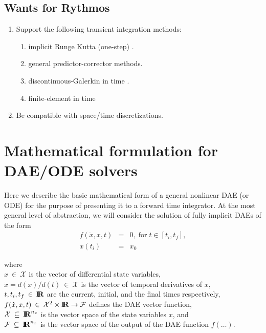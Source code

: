 \documentclass[pdf,ps2pdf,11pt]{SANDreport}
\begin{document}
\subsection{Wants for Rythmos}

\begin{enumerate}

{}\item Support the following transient integration methods:
  \begin{enumerate}
  {}\item implicit Runge Kutta (one-step) \cite{IRKMethods}.
  {}\item general predictor-corrector methods.
  {}\item discontinuous-Galerkin in time \cite{DGTime}.
  {}\item finite-element in time \cite{FETime}
  \end{enumerate}
{}\item Be compatible with space/time discretizations.

\end{enumerate}




\section{Mathematical formulation for DAE/ODE solvers}
\label{rythmos:scn:mathformulation}

Here we describe the basic mathematical form of a general nonlinear DAE (or
ODE) for the purpose of presenting it to a forward time integrator.  At the
most general level of abstraction, we will consider the solution of fully
implicit DAEs of the form
%
\begin{eqnarray}
f(\dot{x},x,t) & = & 0, \; \mbox{for} \; t \in [t_i, t_f], \label{rythmos:eqn:dae} \\
x(t_i) & = & x_0 \label{rythmos:eqn:dae:ic}
\end{eqnarray}
\begin{tabbing}
\hspace{4ex}where\hspace{5ex}\= \\
\>	$x\:\in\:\mathcal{X}$ is the vector of differential state variables, \\
\>	$\dot{x} = d(x)/d(t)\:\in\:\mathcal{X}$ is the vector of temporal derivatives of $x$, \\
\>	$t, t_i, t_f\:\in\:\mbox{\textbf{I}}\hspace{-0.6ex}\mbox{\textbf{R}}$ are the current, initial, and the final times respectively, \\
\>	$f(\dot{x},x,t)\:\in\:\mathcal{X}^2\times\mbox{\textbf{I}}\hspace{-0.6ex}\mbox{\textbf{R}}\rightarrow\mathcal{F}$ defines the DAE vector function, \\
\>	$\mathcal{X} \:\subseteq\:\mbox{\textbf{I}}\hspace{-0.6ex}\mbox{\textbf{R}}^{n_x}$ is the vector space of the state variables $x$, and \\
\>	$\mathcal{F} \:\subseteq\:\mbox{\textbf{I}}\hspace{-0.6ex}\mbox{\textbf{R}}^{n_x}$ is the vector space of the output of the DAE function $f(\ldots)$.
\end{tabbing}
\end{document}
